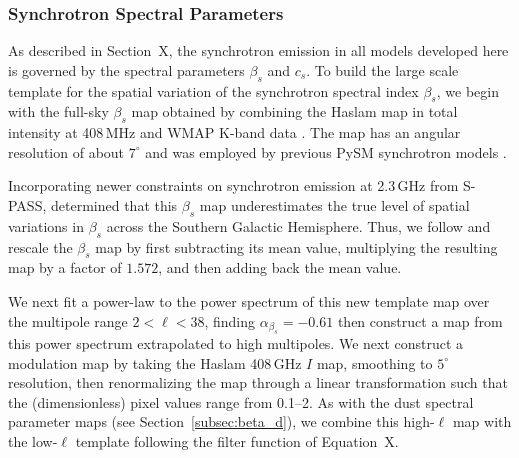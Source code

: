 \documentclass[twocolumn]{aastex631}
\newcommand{\giuse}[1]{\textcolor{orange}{(GP: #1)}}
\begin{document}
 
\subsubsection{Synchrotron Spectral Parameters}\label{sec:beta_s}
As described in Section~X, the synchrotron emission in all models developed here is governed by the spectral parameters $\beta_s$ and $c_s$. To build the large scale template for the spatial variation of the synchrotron spectral index $\beta_s$, we begin with the full-sky $\beta_s$ map obtained by combining the Haslam map in total intensity at 408\,MHz \citep{Remazeilles:2015} and WMAP K-band data \citep{Miville-Deschenes:2008}. The map has an angular resolution of about $7^{\circ}$ and was employed by previous PySM synchrotron models \citep{Thorne:2017}.

Incorporating newer constraints on synchrotron emission at 2.3\,GHz from S-PASS, \citet{Krachmalnicoff:2018} determined that this $\beta_s$ map underestimates the true level of spatial variations in $\beta_s$ across the Southern Galactic Hemisphere. Thus, we follow \citet{Krachmalnicoff:2018} and rescale the $\beta_s$ map by first subtracting its mean value, multiplying the resulting map by a factor of $1.572$, and then adding back the mean value.

We next fit a power-law to the power spectrum of this new template map over the multipole range $2<\ell<38$, finding $\alpha_{\beta_s}=-0.61$ then construct a map from this power spectrum extrapolated to high multipoles. We next construct a modulation map by taking the Haslam 408\,GHz $I$ map, smoothing to $5^\circ$ resolution, then renormalizing the map through a linear transformation such that the (dimensionless) pixel values range from 0.1--2. As with the dust spectral parameter maps (see Section~\ref{subsec:beta_d}), we combine this high-$\ell$ map with the low-$\ell$ template following the filter function of Equation~X. %
 
\end{document}
